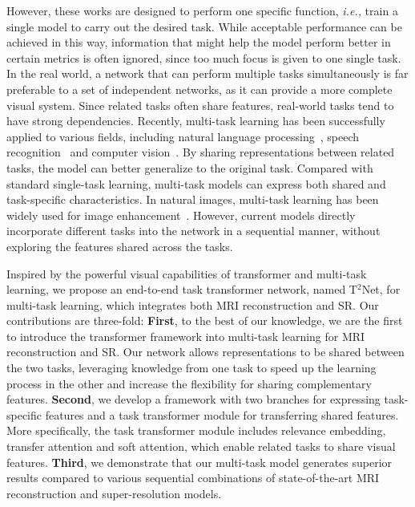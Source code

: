\documentclass[runningheads]{llncs}
\newcommand{\ie}[1]{\textit{i.e.,}}
\begin{document}
However, these works are designed to perform one specific function, \ie, train a single model to carry out the desired task. While acceptable performance can be achieved in this way, information that might help the model perform better in certain metrics is often ignored, since too much focus is given to one single task. In the real world, a network that can perform multiple tasks simultaneously is far preferable to a set of independent networks, as it can provide a more complete visual system. Since related tasks often share features, real-world tasks tend to have strong dependencies. Recently, multi-task learning has been successfully applied to various fields, including natural language processing~\cite{collobert2008unified}, speech recognition~\cite{kim2017joint} and computer vision~\cite{liu2019end}. By sharing representations between related tasks, the model can better generalize to the original task. Compared with standard single-task learning, multi-task models can express both shared and task-specific characteristics. In natural images, multi-task learning has been widely used for image enhancement~\cite{cai2019fcsr,zhang2018joint}. However, current models directly incorporate different tasks into the network in a sequential manner, without exploring the features shared across the tasks.
















Inspired by the powerful visual capabilities of transformer and multi-task learning, we propose an end-to-end task transformer network, named T$^2$Net, for multi-task learning, which integrates both MRI reconstruction and SR. Our contributions are three-fold: \textbf{First}, to the best of our knowledge, we are the first to introduce the transformer framework into multi-task learning for MRI reconstruction and SR. Our network allows representations to be shared between the two tasks, leveraging knowledge from one task to speed up the learning process in the other and increase the flexibility for sharing complementary features. \textbf{Second}, we develop a framework with two branches for expressing task-specific features and a task transformer module for transferring shared features. More specifically, the task transformer module includes relevance embedding, transfer attention and soft attention, which enable related tasks to share visual features. \textbf{Third}, we demonstrate that our multi-task model generates superior results compared to various sequential combinations of state-of-the-art MRI reconstruction and super-resolution models. 
\end{document}

